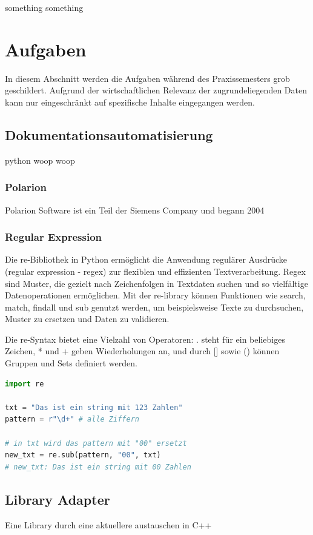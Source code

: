 \documentclass[a4paper, 12pt]{article}
\begin{document}
something something 
\cite{scrum2020}

\newpage
\section{Aufgaben}\label{Aufgaben}
In diesem Abschnitt werden die Aufgaben während des Praxissemesters grob geschildert. Aufgrund der wirtschaftlichen Relevanz der zugrundeliegenden Daten kann nur eingeschränkt auf spezifische Inhalte eingegangen werden.

\subsection{Dokumentationsautomatisierung}\label{Dokumentationsautomatisierung}
python woop woop

\subsubsection{Polarion}\label{polarion}
Polarion Software ist ein Teil der Siemens Company und begann 2004

\subsubsection{Regular Expression}\label{regularExpression}
Die re-Bibliothek in Python ermöglicht die Anwendung regulärer Ausdrücke (regular expression - regex) zur flexiblen und effizienten Textverarbeitung. Regex sind Muster, die gezielt nach Zeichenfolgen in Textdaten suchen und so vielfältige Datenoperationen ermöglichen. Mit der re-library können Funktionen wie search, match, findall und sub genutzt werden, um beispielsweise Texte zu durchsuchen, Muster zu ersetzen und Daten zu validieren.

Die re-Syntax bietet eine Vielzahl von Operatoren: . steht für ein beliebiges Zeichen, * und + geben Wiederholungen an, und durch [] sowie () können Gruppen und Sets definiert werden.

\begin{lstlisting}[language=Python, caption=Beispiel für Python-Code]
import re

txt = "Das ist ein string mit 123 Zahlen"
pattern = r"\d+" # alle Ziffern

# in txt wird das pattern mit "00" ersetzt
new_txt = re.sub(pattern, "00", txt)
# new_txt: Das ist ein string mit 00 Zahlen
\end{lstlisting} %

\subsection{Library Adapter}\label{LibraryAdapter}
Eine Library durch eine aktuellere austauschen in C++
\end{document}

